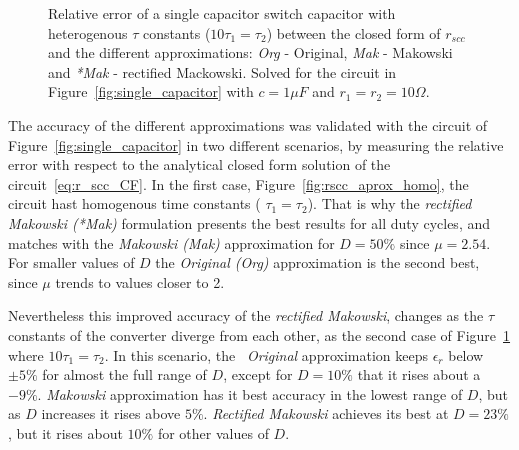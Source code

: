 \begin{figure}[!h]
\newcommand\pHeigh{3.25cm}
\newcommand\pWidth{4.5cm}
\centering
    \begin{subfigure}{\textwidth}
       \parbox[b]{.45\linewidth}{
            \raggedright
            \newcommand\dutyCycle{10}
            \newcommand\uDx{1.74}
            
        }
       \parbox[b]{.45\linewidth}{
            \raggedleft
            \newcommand\dutyCycle{23}
            \newcommand\uDx{2.12}
            
        }
    \end{subfigure}

    \begin{subfigure}{\textwidth}
       \parbox[b]{.45\linewidth}{
            \raggedright
            \newcommand\dutyCycle{36}
            \newcommand\uDx{2.43}
            
        }
       \parbox[b]{.45\linewidth}{
            \raggedleft
            \newcommand\dutyCycle{50}
            \newcommand\uDx{2.54}
            
        }
    \end{subfigure}



\caption[Different approximations methods for $r_{scc}$ scenario II]{Relative error of a single capacitor switch capacitor with heterogenous $\tau$ constants ($10 \tau_1 = \tau_2$)  between the closed form of $r_{scc}$ and the different approximations: \emph{Org} - Original, \emph{Mak} - Makowski and \emph{*Mak} - rectified Mackowski.  Solved for the circuit in Figure~\ref{fig:single_capacitor} with $c=1\mu F$ and $r_1=r_2=10\Omega$.}
\label{fig:rscc_aprox_hete}
\end{figure}

The accuracy of the different approximations was validated with the circuit of Figure~\ref{fig:single_capacitor} in two different scenarios, by measuring the relative error with respect to the analytical closed form solution of the circuit~\eqref{eq:r_scc_CF}. In the first case, Figure~\ref{fig:rscc_aprox_homo},  the circuit hast homogenous time constants ( $\tau_1 = \tau_2$). That is why the \emph{rectified Makowski (*Mak)} formulation presents the best results for all duty cycles, and matches with the \emph{Makowski (Mak)} approximation for $D=50\%$ since $\mu=2.54$. For smaller values of $D$ the \emph{Original (Org) } approximation is the second best, since $\mu$ trends to values closer to 2.

Nevertheless this improved accuracy of the \emph{rectified Makowski},  changes as the $\tau$ constants of the converter diverge from each other, as the second case of Figure~\ref{fig:rscc_aprox_hete} where $10\tau_1 = \tau_2$. In this scenario, the ~\emph{Original} approximation keeps $\epsilon_r$ below $\pm5\%$ for almost the full range of $D$, except for $D=10\%$ that it rises about a $-9\%$. \emph{Makowski} approximation has it best accuracy in the lowest range of $D$, but as  $D$ increases it rises above $5\%$.  \emph{Rectified Makowski} achieves its best at $D=23\%$, but it rises about $10\%$ for other values of $D$.

